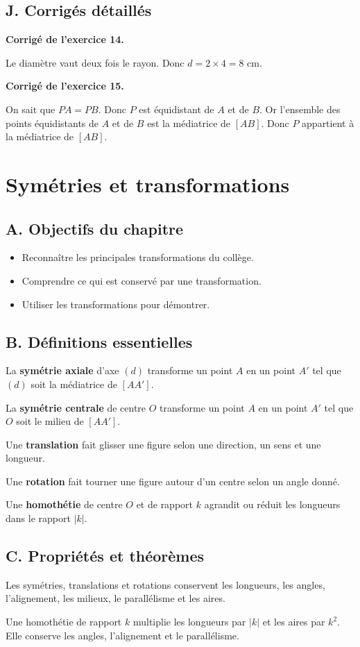 \documentclass[11pt,a4paper]{article}
\newcounter{exercice}
\newenvironment{corrige}[1][]
{\par\medskip\noindent\textbf{Corrigé de l'exercice #1.}\par\smallskip}
{\medskip}
\newcommand{\chapitre}[1]{
\clearpage
\section{#1}
}
\newcommand{\objectif}[1]{\subsection*{A. Objectifs du chapitre}#1}
\newcommand{\defs}{\subsection*{B. Définitions essentielles}}
\newcommand{\props}{\subsection*{C. Propriétés et théorèmes}}
\newcommand{\corriges}{\subsection*{J. Corrigés détaillés}}
\begin{document}
\corriges
\begin{corrige}[14]
Le diamètre vaut deux fois le rayon. Donc $d=2\times 4=8$ cm.
\end{corrige}

\begin{corrige}[15]
On sait que $PA=PB$. Donc $P$ est équidistant de $A$ et de $B$. Or l'ensemble des points équidistants de $A$ et de $B$ est la médiatrice de $[AB]$. Donc $P$ appartient à la médiatrice de $[AB]$.
\end{corrige}

\chapitre{Symétries et transformations}

\objectif{
\begin{itemize}
\item Reconnaître les principales transformations du collège.
\item Comprendre ce qui est conservé par une transformation.
\item Utiliser les transformations pour démontrer.
\end{itemize}}

\defs
\begin{definitionbox}
La \textbf{symétrie axiale} d'axe $(d)$ transforme un point $A$ en un point $A'$ tel que $(d)$ soit la médiatrice de $[AA']$.

La \textbf{symétrie centrale} de centre $O$ transforme un point $A$ en un point $A'$ tel que $O$ soit le milieu de $[AA']$.
\end{definitionbox}

\begin{definitionbox}
Une \textbf{translation} fait glisser une figure selon une direction, un sens et une longueur.

Une \textbf{rotation} fait tourner une figure autour d'un centre selon un angle donné.

Une \textbf{homothétie} de centre $O$ et de rapport $k$ agrandit ou réduit les longueurs dans le rapport $|k|$.
\end{definitionbox}

\props
\begin{proprietebox}
Les symétries, translations et rotations conservent les longueurs, les angles, l'alignement, les milieux, le parallélisme et les aires.
\end{proprietebox}

\begin{proprietebox}
Une homothétie de rapport $k$ multiplie les longueurs par $|k|$ et les aires par $k^2$. Elle conserve les angles, l'alignement et le parallélisme.
\end{proprietebox}
\end{document}
